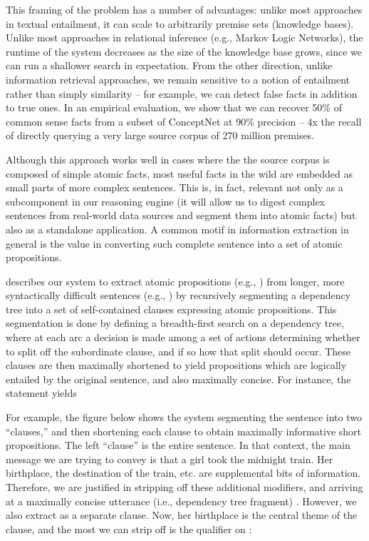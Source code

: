 This framing of the problem has a number of advantages: unlike most 
  approaches in textual entailment, it can scale to arbitrarily premise sets (knowledge bases).
Unlike most approaches in relational inference (e.g., Markov Logic Networks), 
  the runtime of the system decreases as the size of the knowledge base grows, 
  since we can run a shallower search in expectation.
From the other direction, unlike information retrieval approaches, we remain 
  sensitive to a notion of entailment rather than simply similarity -- for example, 
  we can detect false facts in addition to true ones.
In an empirical evaluation, we show that we can recover 50\% of common sense facts 
  from a subset of ConceptNet at 90\% precision -- 4x the recall of directly querying 
  a very large source corpus of 270 million premises.



%
%
Although this approach works well in cases where the the source corpus is composed
  of simple atomic facts, most useful facts in the wild are embedded as small parts
  of more complex sentences.
This is, in fact, relevant not only as a
  subcomponent in our reasoning engine (it will allow us to digest complex
  sentences from real-world data sources and segment them into atomic facts)
  but also as a standalone application.
A common motif in information extraction in general is the value in 
  converting such complete sentence into a set of atomic propositions.

 describes our system to extract atomic propositions (e.g., 
  ) from longer, more syntactically difficult 
  sentences (e.g., ) by recursively 
  segmenting a dependency tree into a set of self-contained clauses expressing 
  atomic propositions.
This segmentation is done by defining a breadth-first search on a dependency tree,
  where at each arc a decision is made among a set of actions determining whether
  to split off the subordinate clause, and if so how that split should occur.
These clauses are then maximally shortened to yield propositions which are
  logically entailed by the original sentence, and also maximally concise.
For instance, the statement 
  yields  

For example, the figure below shows the system segmenting the sentence
   into
  two ``clauses,'' and then shortening each clause to obtain maximally informative
  short propositions.
The left ``clause'' is the entire sentence.
In that context, the main message we are trying to convey is that a girl took the
  midnight train.
Her birthplace, the destination of the train, etc. are supplemental bits of information.
Therefore, we are justified in stripping off these additional modifiers, and arriving
  at a maximally concise utterance (i.e., dependency tree fragment) .
However, we also extract  as a separate clause.
Now, her birthplace is the central theme of the clause, and the most we can strip off is the qualifier
   on :

